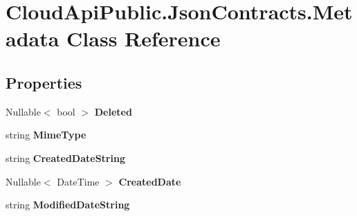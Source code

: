 \hypertarget{class_cloud_api_public_1_1_json_contracts_1_1_metadata}{\section{Cloud\-Api\-Public.\-Json\-Contracts.\-Metadata Class Reference}
\label{class_cloud_api_public_1_1_json_contracts_1_1_metadata}
}
\subsection*{Properties}
\begin{DoxyCompactItemize}
\item 
\hypertarget{class_cloud_api_public_1_1_json_contracts_1_1_metadata_a9200aa948a89d798ada667079b4de8b1}{Nullable$<$ bool $>$ {\bfseries Deleted}}\label{class_cloud_api_public_1_1_json_contracts_1_1_metadata_a9200aa948a89d798ada667079b4de8b1}

\item 
\hypertarget{class_cloud_api_public_1_1_json_contracts_1_1_metadata_a5396dc2ada5dd816806753436d34e187}{string {\bfseries Mime\-Type}}\label{class_cloud_api_public_1_1_json_contracts_1_1_metadata_a5396dc2ada5dd816806753436d34e187}

\item 
\hypertarget{class_cloud_api_public_1_1_json_contracts_1_1_metadata_afe137e15b43b232b0fa2b5a674472cb9}{string {\bfseries Created\-Date\-String}}\label{class_cloud_api_public_1_1_json_contracts_1_1_metadata_afe137e15b43b232b0fa2b5a674472cb9}

\item 
\hypertarget{class_cloud_api_public_1_1_json_contracts_1_1_metadata_a5870f34275fdfa94a316fd4d1f8e6979}{Nullable$<$ Date\-Time $>$ {\bfseries Created\-Date}}\label{class_cloud_api_public_1_1_json_contracts_1_1_metadata_a5870f34275fdfa94a316fd4d1f8e6979}

\item 
\hypertarget{class_cloud_api_public_1_1_json_contracts_1_1_metadata_a3a2a352eebaa6b9262297bc8e66a890e}{string {\bfseries Modified\-Date\-String}}\label{class_cloud_api_public_1_1_json_contracts_1_1_metadata_a3a2a352eebaa6b9262297bc8e66a890e}


\end{DoxyCompactItemize}
